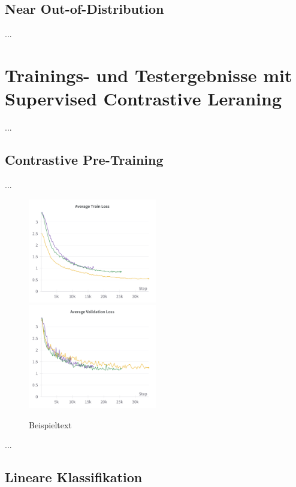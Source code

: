 \subsection{Near Out-of-Distribution}

...

\section{Trainings- und Testergebnisse mit Supervised Contrastive Leraning}

...

\subsection{Contrastive Pre-Training}

...

\begin{figure}
	\centering
	\includegraphics[width=0.5\textwidth]{figure_results_supcon-pre_avg-train-loss.png}%
	\includegraphics[width=0.5\textwidth]{figure_results_supcon-pre_avg-val-loss.png}
	\caption{Beispieltext}
	\label{fig:supcon-pre-loss}
\end{figure}

...

\subsection{Lineare Klassifikation}

